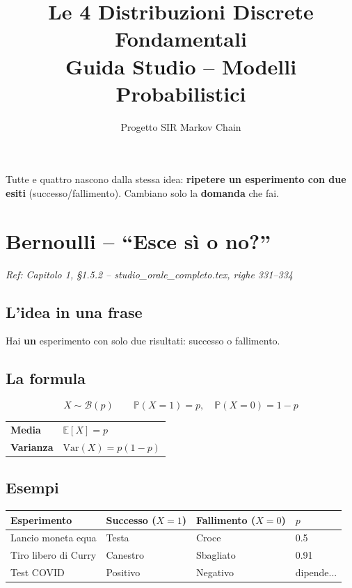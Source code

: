 \documentclass[a4paper,11pt]{article}
\title{\textbf{Le 4 Distribuzioni Discrete Fondamentali}\\[0.3em]
\large Guida Studio -- Modelli Probabilistici}
\author{Progetto SIR Markov Chain}
\date{}
\newcommand{\PP}{\mathbb{P}}
\newcommand{\E}{\mathbb{E}}
\begin{document}
\maketitle
\tableofcontents
\vspace{1em}

\begin{tcolorbox}[mybox=blue, title=Filo conduttore]
Tutte e quattro nascono dalla stessa idea: \textbf{ripetere un esperimento con due esiti} (successo/fallimento). Cambiano solo la \textbf{domanda} che fai.
\end{tcolorbox}

\section{Bernoulli -- ``Esce sì o no?''}
\label{sec:bernoulli}

\textit{Ref: Capitolo 1, \S1.5.2 -- studio\_orale\_completo.tex, righe 331--334}

\subsection*{L'idea in una frase}
Hai \textbf{un} esperimento con solo due risultati: successo o fallimento.

\subsection*{La formula}
\[
X \sim \mathcal{B}(p) \qquad \PP(X=1) = p, \quad \PP(X=0) = 1-p
\]

\begin{center}
\begin{tabular}{ll}
\toprule
\textbf{Media} & $\E[X] = p$ \\
\textbf{Varianza} & $\text{Var}(X) = p(1-p)$ \\
\bottomrule
\end{tabular}
\end{center}

\subsection*{Esempi}

\begin{center}
\begin{tabular}{llll}
\toprule
\textbf{Esperimento} & \textbf{Successo} ($X=1$) & \textbf{Fallimento} ($X=0$) & $p$ \\
\midrule
Lancio moneta equa & Testa & Croce & 0.5 \\
Tiro libero di Curry & Canestro & Sbagliato & 0.91 \\
Test COVID & Positivo & Negativo & dipende... \\
\bottomrule
\end{tabular}
\end{center}
\end{document}
